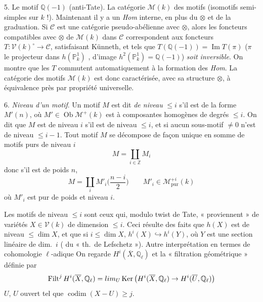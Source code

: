 \documentclass[11pt,a4paper]{article}
\begin{document}
5. Le motif $\mathbb{Q}(-1)$ (anti-Tate). La catégorie $\mathcal{M}(k)$ des
motifs (isomotifs semi-simples sur $k$ !). Maintenant il y a un
\emph{Hom} interne, en plus du $\otimes$ et de la graduation. Si
$\mathcal{C}$ est une catégorie pseudo-abélienne avec $\otimes$, alors les
foncteurs compatibles avec $\otimes$ de $\mathcal{M}(k)$ dans $\mathcal{C}$
correspondent aux foncteurs $T : \mathcal{V}(k)^{\circ} \to \mathcal{C}$,
satisfaisant Künneth, et tels que \struck{\ill{}}
$T(\mathbb{Q}(-1)) = \operatorname{Im} T(\pi)$ ($\pi$ le projecteur dans
$h(\mathbb{P}^{1}_{k})$ \struck{\ill{}}, d'image
$h^{2}(\mathbb{P}^{1}_{k}) = \mathbb{Q}(-1)$) \emph{soit inversible}. On
montre que les $T$ commutent automatiquement à la formation des \emph{Hom}.
La catégorie des motifs $\mathcal{M}(k)$ est donc caractérisée, avec sa
structure $\otimes$, \struck{\ill{}} à équivalence près par propriété
universelle.


6. \emph{Niveau d'un motif}. Un motif $M$ est dit \emph{de niveau}
$\leq i$ s'il est de la forme $M'(n)$, où $M' \in \operatorname{Ob}
\mathcal{M}^{+}(k)$ est à composantes homogènes de degrés $\leq i$. On dit
que $M$ est  de niveau $i$ s'il est de niveau $\leq i$, et
si aucun sous-motif $\neq 0$ n'est de niveau $\leq i-1$.  Tout motif $M$ se décompose de façon unique en somme de
motifs purs de niveau $i$
\[
  M = \coprod_{i \in \mathbb{Z}} M_{i}
\]
donc s'il est de  poids $n$,  
\[
  M = \coprod_{i} M'_{i}\Big(\frac{n-i}{2}\Big) \qquad
  M'_{i} \in \mathcal{M}^{+i}_{\text{pur}}(k)
\]
où $M'_{i}$ est   pur de poids et
niveau $i$.

\struck{\ill{}} Les motifs de  niveau $\leq i$ sont ceux qui,
modulo twist de Tate, « proviennent » de variétés $X \in \mathcal{V}(k)$ de
dimension $\leq i$. Ceci résulte des faits que $h(X)$ est de niveau
$\leq \dim X$, et que  si $i \leq \dim X$,
$h^{i}(X) \hookrightarrow h^{i}(Y)$, où $Y$ est une section linéaire de
dim.\ $i$ ( du « th.\ de Lefschetz »). Autre interprétation en
termes de cohomologie $\ell$-adique  On regarde
$H^{i}(\overline{X}, \mathbb{Q}_{\ell})$ et la « filtration géométrique »
définie par
\[
  \operatorname{Filt}^{j} H^{i}(\overline{X}, \mathbb{Q}_{\ell}) =
  \varinjlim_{U} \operatorname{Ker}\big(H^{i}(\overline{X}, \mathbb{Q}_{\ell})
  \to H^{i}(\overline{U}, \mathbb{Q}_{\ell})\big)
\]
$U$, $U$ ouvert tel que $\operatorname{codim}(X-U) \geq j$.
\end{document}
